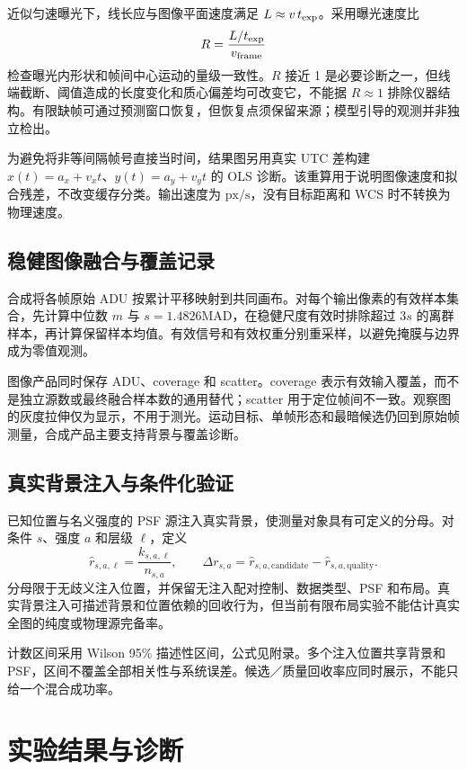 \documentclass[UTF8,a4paper,11pt,fontset=windows]{ctexart}
\newcommand{\px}{\mathrm{px}}
\newcommand{\MAD}{\mathrm{MAD}}
\begin{document}
近似匀速曝光下，线长应与图像平面速度满足 $L\approx v\,t_{\rm exp}$。采用曝光速度比
\begin{equation}
 R=\frac{L/t_{\rm exp}}{v_{\rm frame}}
\end{equation}
检查曝光内形状和帧间中心运动的量级一致性。$R$ 接近 1 是必要诊断之一，但线端截断、阈值造成的长度变化和质心偏差均可改变它，不能据 $R\approx1$ 排除仪器结构。有限缺帧可通过预测窗口恢复，但恢复点须保留来源；模型引导的观测并非独立检出。

为避免将非等间隔帧号直接当时间，结果图另用真实 UTC 差构建 $x(t)=a_x+v_xt$、$y(t)=a_y+v_yt$ 的 OLS 诊断。该重算用于说明图像速度和拟合残差，不改变缓存分类。输出速度为 $\px/\mathrm{s}$，没有目标距离和 WCS 时不转换为物理速度。

\subsection{稳健图像融合与覆盖记录}
合成将各帧原始 ADU 按累计平移映射到共同画布。对每个输出像素的有效样本集合，先计算中位数 $m$ 与 $s=1.4826\MAD$，在稳健尺度有效时排除超过 $3s$ 的离群样本，再计算保留样本均值。有效信号和有效权重分别重采样，以避免掩膜与边界成为零值观测。

图像产品同时保存 ADU、coverage 和 scatter。coverage 表示有效输入覆盖，而不是独立源数或最终融合样本数的通用替代；scatter 用于定位帧间不一致。观察图的灰度拉伸仅为显示，不用于测光。运动目标、单帧形态和最暗候选仍回到原始帧测量，合成产品主要支持背景与覆盖诊断。

\subsection{真实背景注入与条件化验证}
已知位置与名义强度的 PSF 源注入真实背景，使测量对象具有可定义的分母。对条件 $s$、强度 $a$ 和层级 $\ell$，定义
\begin{equation}
 \widehat r_{s,a,\ell}=\frac{k_{s,a,\ell}}{n_{s,a}},\qquad
 \Delta r_{s,a}=\widehat r_{s,a,\mathrm{candidate}}-\widehat r_{s,a,\mathrm{quality}}.
\end{equation}
分母限于无歧义注入位置，并保留无注入配对控制、数据类型、PSF 和布局。真实背景注入可描述背景和位置依赖的回收行为\cite{comest}，但当前有限布局实验不能估计真实全图的纯度或物理源完备率。

计数区间采用 Wilson 95\% 描述性区间，公式见附录。多个注入位置共享背景和 PSF，区间不覆盖全部相关性与系统误差。候选／质量回收率应同时展示，不能只给一个混合成功率。

\FloatBarrier
\section{实验结果与诊断}\label{sec:results}
\end{document}
